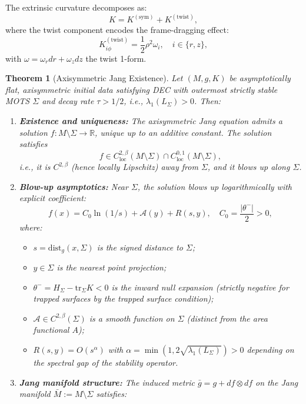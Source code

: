 \documentclass[12pt]{article}
\theoremstyle{plain}
\newtheorem{theorem}{Theorem}[section]
\theoremstyle{definition}
\theoremstyle{remark}
\newcommand{\tr}{\mathrm{tr}}
\newcommand{\bg}{\bar{g}}
\newcommand{\bM}{\bar{M}}
\begin{document}
The extrinsic curvature decomposes as:
\begin{equation}
K = K^{(\text{sym})} + K^{(\text{twist})},
\end{equation}
where the twist component encodes the frame-dragging effect:
\begin{equation}
K^{(\text{twist})}_{i\phi} = \frac{1}{2}\rho^2 \omega_i, \quad i \in \{r, z\},
\end{equation}
with $\omega = \omega_r dr + \omega_z dz$ the twist 1-form.

\begin{theorem}[Axisymmetric Jang Existence]\label{thm:jang-exist}
Let $(M, g, K)$ be asymptotically flat, axisymmetric initial data satisfying DEC with outermost strictly stable MOTS $\Sigma$ and decay rate $\tau > 1/2$, i.e., $\lambda_1(L_\Sigma) > 0$. Then:
\begin{enumerate}[label=\textup{(\roman*)}]
    \item \textbf{Existence and uniqueness:} The axisymmetric Jang equation admits a solution $f: M \setminus \Sigma \to \mathbb{R}$, unique up to an additive constant. The solution satisfies
    \[
    f \in C^{2,\beta}_{\mathrm{loc}}(M \setminus \Sigma) \cap C^{0,1}_{\mathrm{loc}}(M \setminus \Sigma),
    \]
    i.e., it is $C^{2,\beta}$ (hence locally Lipschitz) away from $\Sigma$, and it blows up along $\Sigma$.
    \item \textbf{Blow-up asymptotics:} Near $\Sigma$, the solution blows up logarithmically with explicit coefficient:
    \[
    f(x) = C_0 \ln(1/s) + \mathcal{A}(y) + R(s,y), \quad C_0 = \frac{|\theta^-|}{2} > 0,
    \]
    where:
    \begin{itemize}
        \item $s = \mathrm{dist}_g(x, \Sigma)$ is the signed distance to $\Sigma$;
        \item $y \in \Sigma$ is the nearest point projection;
        \item $\theta^- = H_\Sigma - \tr_\Sigma K < 0$ is the inward null expansion (strictly negative for trapped surfaces by the trapped surface condition);
        \item $\mathcal{A} \in C^{2,\beta}(\Sigma)$ is a smooth function on $\Sigma$ (distinct from the area functional $A$);
        \item $R(s,y) = O(s^\alpha)$ with $\alpha = \min(1, 2\sqrt{\lambda_1(L_\Sigma)}) > 0$ depending on the spectral gap of the stability operator.
    \end{itemize}
    \item \textbf{Jang manifold structure:} The induced metric $\bg = g + df \otimes df$ on the Jang manifold $\bM := M \setminus \Sigma$ satisfies:

\end{enumerate}
\end{theorem}
\end{document}
